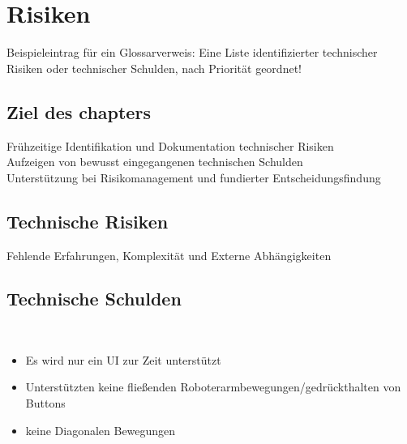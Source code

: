 \chapter{Risiken}

Beispieleintrag für ein Glossarverweis: %
Eine Liste identifizierter technischer Risiken oder technischer Schulden, nach Priorität geordnet!
\\
\section{Ziel des chapters}
Frühzeitige Identifikation und Dokumentation technischer Risiken\\
Aufzeigen von bewusst eingegangenen technischen Schulden\\
Unterstützung bei Risikomanagement und fundierter Entscheidungsfindung\\

\section{Technische Risiken}
Fehlende Erfahrungen, Komplexität und Externe Abhängigkeiten



\section{Technische Schulden}
\\
\begin{itemize}
    \item Es wird nur ein UI zur Zeit unterstützt
    \item Unterstützten keine fließenden Roboterarmbewegungen/gedrückthalten von Buttons
    \item keine Diagonalen Bewegungen
\end{itemize}

